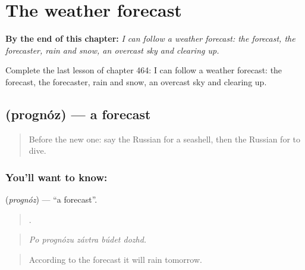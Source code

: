 
\chapter{The weather forecast}
\label{ch:ru-the-weather-forecast}

\begin{chapteropening}
\textbf{By the end of this chapter:} \emph{I can follow a weather forecast: the forecast, the forecaster, rain and snow, an overcast sky and clearing up.}

Complete the last lesson of chapter 464: I can follow a weather forecast: the forecast, the forecaster, rain and snow, an overcast sky and clearing up.
\end{chapteropening}

\section[\texorpdfstring{\ru{прогноз} (prognóz)}{прогноз (prognóz)}]{ (prognóz) — a forecast}

\label{lesson:RU-C464-prognoz}



\begin{quote}
Before the new one: say the Russian for a seashell, then the Russian for to dive.
\end{quote}

\subsection*{You'll want to know: }
\textbf{} (\emph{prognóz}) — \textquotedblleft{}a forecast\textquotedblright{}.

\begin{quote}
    .
\end{quote}

\begin{quote}
\emph{Po prognózu závtra búdet dozhd.}
\end{quote}

\begin{quote}
According to the forecast it will rain tomorrow.
\end{quote}

